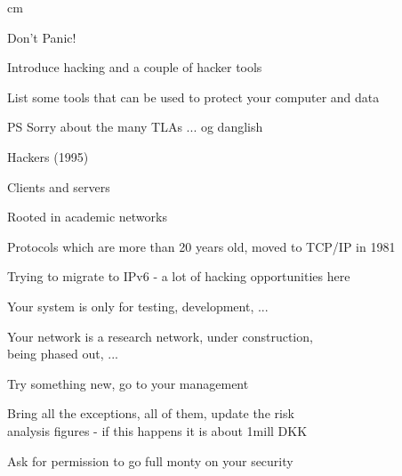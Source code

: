 \documentclass[Screen16to9,17pt]{foils}
\begin{document}


 cm


\centerline{\color{titlecolor}\LARGE Don't Panic!}

\begin{list1}
\item Introduce hacking and a couple of hacker tools
\item List some tools that can be used to protect your computer and data
\item PS Sorry about the many TLAs ... og danglish
\end{list1}



\centerline{ Hackers (1995)}




\begin{list1}
\item Clients and servers
\item Rooted in academic networks
\item Protocols which are more than 20 years old, moved to TCP/IP in 1981
\item Trying to migrate to IPv6 - a lot of hacking opportunities here
\end{list1}



Your system is only for testing, development, ...

Your network is a research network, under construction, \\
being phased out, ...

Try something new, go to your management

Bring all the exceptions, all of them, update the risk \\
analysis figures - if this happens it is about 1mill DKK

Ask for permission to go full monty on your security
\end{document}
